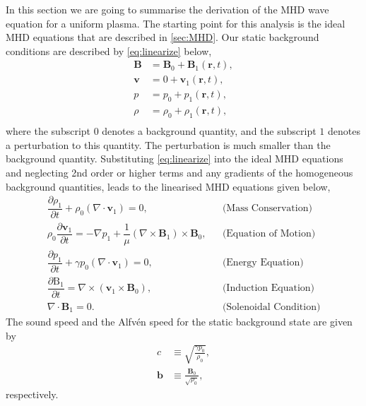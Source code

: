 \documentclass[a4paper,12pt,fourier,authoryear,custommargin]{Classes/PhDThesisPSnPDF}
\renewcommand{\vec}{\mathbf}
\begin{document}
In this section we are going to summarise the derivation of the MHD wave equation for a uniform plasma.
The starting point for this analysis is the ideal MHD equations that are described in \cref{sec:MHD}.
Our static background conditions are described by \cref{eq:linearize} below,
\begin{equation}\label{eq:linearize}
    \begin{aligned}                                                    
        \vec{B} &= \vec{B}_0 + \vec{B}_1(\vec{r},t),\\
        \vec{v} &= 0 + \vec{v}_1(\vec{r},t),\\
        p &= p_0 + {p_1}(\vec{r},t),\\
        \rho &= \rho_0 + {\rho_1}(\vec{r},t),\\
    \end{aligned}
\end{equation}
where the subscript $0$ denotes a background quantity, and the subscript $1$ denotes a perturbation to this quantity.
The perturbation is much smaller than the background quantity.
Substituting \cref{eq:linearize} into the ideal MHD equations and neglecting 2nd order or higher terms and any gradients of the homogeneous background quantities, leads to the linearised MHD equations given below,
\begin{align}                                                         
    \dfrac{\partial \rho_1 }{\partial t} + \rho_0 (\nabla \cdot \vec{v}_1) =       
    0,
    &&\text{(Mass Conservation)}\label{eq:lmhd_mass}\\
    \rho_0 \dfrac{\partial \vec{v}_1}{\partial t} =
    -\nabla p_1 + \dfrac{1}{\mu}(\nabla \times \vec{B}_1) \times \vec{B}_0,
    &&\text{(Equation of Motion)}\label{eq:lmhd_motion}\\
    \dfrac{\partial p_1}{\partial t} + \gamma p_0 \left( \nabla \cdot \vec{v}_1 \right) = 0,
    &&\text{(Energy Equation)}\label{eq:lmhd_energy}\\
    \dfrac{\partial \mathrm{B}_1}{\partial t} = \nabla \times (\vec{v}_1 \times \vec{B}_0),
    &&\text{(Induction Equation)}\label{eq:lmhd_induction}\\
    \nabla \cdot \vec{B}_1 = 0.
    &&\text{(Solenoidal Condition)}\label{eq:lmhd_solenoid}              
\end{align}
The sound speed and the Alfv\'en speed for the static background state are given by 
\begin{align}
    c &\equiv \sqrt{\frac{\gamma p_0}{\rho_0}},\label{eq:soundspeed}\\
    \vec{b} &\equiv \frac{\vec{B}_0}{\sqrt{\rho_0}},\label{eq:alfvenspeed}
\end{align}
respectively.
\end{document}
